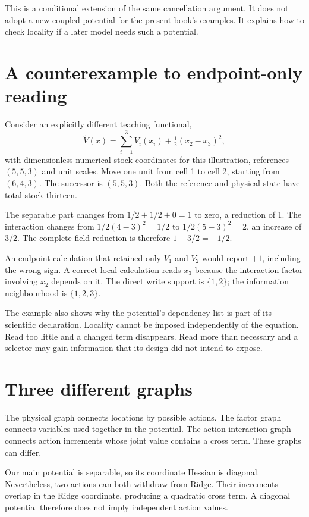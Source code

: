 This is a conditional extension of the same cancellation argument. It does not adopt a new coupled potential for the present book's examples. It explains how to check locality if a later model needs such a potential.

\section{A counterexample to endpoint-only reading}
Consider an explicitly different teaching functional,
\[
 \widetilde V(x)=\sum_{i=1}^{3}V_i(x_i)+\tfrac12(x_2-x_3)^2,
\]
with dimensionless numerical stock coordinates for this illustration, references $(5,5,3)$ and unit scales. Move one unit from cell 1 to cell 2, starting from $(6,4,3)$. The successor is $(5,5,3)$. Both the reference and physical state have total stock thirteen.

The separable part changes from $1/2+1/2+0=1$ to zero, a reduction of 1. The interaction changes from $1/2(4-3)^2=1/2$ to $1/2(5-3)^2=2$, an increase of $3/2$. The complete field reduction is therefore $1-3/2=-1/2$.

An endpoint calculation that retained only $V_1$ and $V_2$ would report $+1$, including the wrong sign. A correct local calculation reads $x_3$ because the interaction factor involving $x_2$ depends on it. The direct write support is $\{1,2\}$; the information neighbourhood is $\{1,2,3\}$.

The example also shows why the potential's dependency list is part of its scientific declaration. Locality cannot be imposed independently of the equation. Read too little and a changed term disappears. Read more than necessary and a selector may gain information that its design did not intend to expose.

\section{Three different graphs}
The physical graph connects locations by possible actions. The factor graph connects variables used together in the potential. The action-interaction graph connects action increments whose joint value contains a cross term. These graphs can differ.

Our main potential is separable, so its coordinate Hessian is diagonal. Nevertheless, two actions can both withdraw from Ridge. Their increments overlap in the Ridge coordinate, producing a quadratic cross term. A diagonal potential therefore does not imply independent action values.

